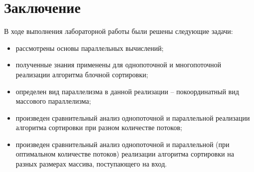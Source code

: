 \chapter*{Заключение}

В ходе выполнения лабораторной работы были решены следующие задачи:

\begin{itemize}
	\item рассмотрены основы параллельных вычислений;
	\item полученные знания применены для однопоточной и многопоточной реализации алгоритма блочной сортировки;
	\item определен вид параллелизма в данной реализации -- покоординатный вид массового параллелизма;
	\item произведен сравнительный анализ однопоточной и параллельной реализации алгоритма сортировки при разном количестве потоков;
	\item произведен сравнительный анализ однопоточной и параллельной (при оптимальном количестве потоков) реализации алгоритма сортировки на разных размерах массива, поступающего на вход.
\end{itemize}

